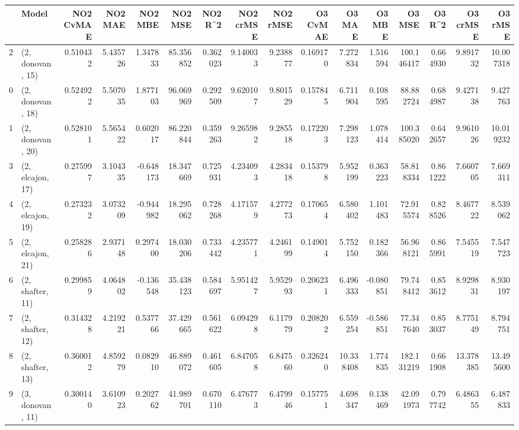 \begin{tabular}{llrrrrrrrrrrrrrr}
\toprule
{} &             Model &  NO2 CvMAE &   NO2 MAE &   NO2 MBE &     NO2 MSE &   NO2 R\textasciicircum2 &  NO2 crMSE &   NO2 rMSE &  O3 CvMAE &     O3 MAE &    O3 MBE &      O3 MSE &    O3 R\textasciicircum2 &   O3 crMSE &    O3 rMSE \\
\midrule
2  &  (2, donovan, 15) &   0.510432 &  5.435726 &  1.347833 &   85.356852 &  0.362023 &   9.140033 &   9.238877 &  0.169170 &   7.272834 &  1.516594 &  100.146417 &  0.664930 &   9.891732 &  10.007318 \\
0  &  (2, donovan, 18) &   0.524922 &  5.507035 &  1.877103 &   96.069969 &  0.292509 &   9.620107 &   9.801529 &  0.157845 &   6.711904 &  0.108595 &   88.882724 &  0.684987 &   9.427138 &   9.427763 \\
1  &  (2, donovan, 20) &   0.528101 &  5.565422 &  0.602017 &   86.220844 &  0.359263 &   9.265982 &   9.285518 &  0.172203 &   7.298123 &  1.078414 &  100.385020 &  0.642657 &   9.961026 &  10.019232 \\
3  &  (2, elcajon, 17) &   0.275997 &  3.104335 & -0.648173 &   18.347669 &  0.725931 &   4.234093 &   4.283418 &  0.153798 &   5.952199 &  0.363223 &   58.818334 &  0.861222 &   7.660705 &   7.669311 \\
4  &  (2, elcajon, 19) &   0.273232 &  3.073209 & -0.944982 &   18.295062 &  0.728268 &   4.171579 &   4.277273 &  0.170654 &   6.580402 &  1.101483 &   72.915574 &  0.828526 &   8.467722 &   8.539062 \\
5  &  (2, elcajon, 21) &   0.258286 &  2.937148 &  0.297400 &   18.030206 &  0.733442 &   4.235771 &   4.246199 &  0.149014 &   5.752150 &  0.182366 &   56.968121 &  0.865991 &   7.545519 &   7.547723 \\
6  &  (2, shafter, 11) &   0.299859 &  4.064802 & -0.136548 &   35.438123 &  0.584697 &   5.951427 &   5.952993 &  0.206231 &   6.496333 & -0.080851 &   79.748412 &  0.853612 &   8.929831 &   8.930197 \\
7  &  (2, shafter, 12) &   0.314328 &  4.219221 &  0.537766 &   37.429665 &  0.561622 &   6.094298 &   6.117979 &  0.208202 &   6.559254 & -0.586851 &   77.347640 &  0.853037 &   8.775149 &   8.794751 \\
8  &  (2, shafter, 13) &   0.360012 &  4.859279 &  0.082910 &   46.889072 &  0.461605 &   6.847058 &   6.847560 &  0.326240 &  10.338408 &  1.774835 &  182.131219 &  0.661908 &  13.378385 &  13.495600 \\
9  &  (3, donovan, 11) &   0.300140 &  3.610923 &  0.202762 &   41.989701 &  0.670110 &   6.476773 &   6.479946 &  0.157751 &   4.698347 &  0.138469 &   42.091973 &  0.797742 &   6.486355 &   6.487833 \\

\end{tabular}
